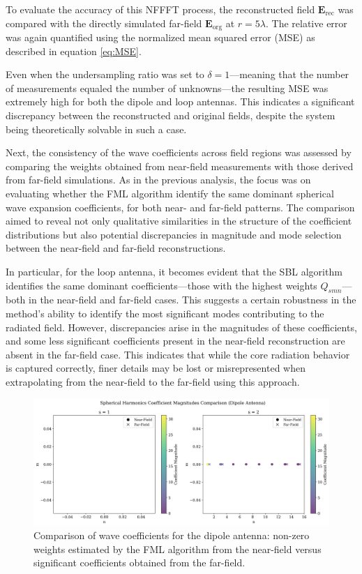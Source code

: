 \documentclass{article}
\begin{document}
To evaluate the accuracy of this NFFFT process, the reconstructed field $\mathbf{E}_{\text{rec}}$ was compared with the directly simulated far-field $\mathbf{E}_{\text{org}}$ at $r = 5\lambda$. The relative error was again quantified using the normalized mean squared error (MSE) as described in equation \ref{eq:MSE}.

Even when the undersampling ratio was set to $\delta = 1$—meaning that the number of measurements equaled the number of unknowns—the resulting MSE was extremely high for both the dipole and loop antennas. This indicates a significant discrepancy between the reconstructed and original fields, despite the system being theoretically solvable in such a case.

Next, the consistency of the wave coefficients across field regions was assessed by comparing the weights obtained from near-field measurements with those derived from far-field simulations. As in the previous analysis, the focus was on evaluating whether the FML algorithm identify the same dominant spherical wave expansion coefficients, for both near- and far-field patterns. The comparison aimed to reveal not only qualitative similarities in the structure of the coefficient distributions but also potential discrepancies in magnitude and mode selection between the near-field and far-field reconstructions.

In particular, for the loop antenna, it becomes evident that the SBL algorithm identifies the same dominant coefficients—those with the highest weights $Q_{smn}$—both in the near-field and far-field cases. This suggests a certain robustness in the method's ability to identify the most significant modes contributing to the radiated field. However, discrepancies arise in the magnitudes of these coefficients, and some less significant coefficients present in the near-field reconstruction are absent in the far-field case. This indicates that while the core radiation behavior is captured correctly, finer details may be lost or misrepresented when extrapolating from the near-field to the far-field using this approach.

\begin{figure}[H]
    \centering
    \includegraphics[width=1\linewidth]{Figures/dipole_nf_ff_weights.png}
    \caption{Comparison of wave coefficients for the dipole antenna: non-zero weights estimated by the FML algorithm from the near-field versus significant coefficients obtained from the far-field.}
    \label{fig:dipole_nfff_weights}
\end{figure}
\end{document}
